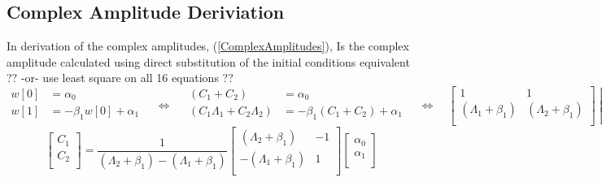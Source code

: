 \documentclass[10pt]{amsart}
\begin{document}
\subsection{Complex Amplitude Deriviation } 

In derivation of the complex amplitudes, (\ref{ComplexAmplitudes}),
Is the complex amplitude calculated using direct substitution
of the initial conditions equivalent ??
{\color{red} 
-or- use least square on all 16 equations ??
}
\[
\begin{split}
  w[ 0]&=                   \alpha_0                    \\
  w[ 1]&=-\beta_1 w[ 0]                     + \alpha_1   \\
\end{split}
\quad \Leftrightarrow \quad
\begin{split}
 \left(C_1            + C_2            \right)&=                                    \alpha_0   \\
 \left(C_1 \Lambda_1  + C_2 \Lambda_2  \right)&=-\beta_1 \left(C_1 + C_2 \right)  + \alpha_1   \\
\end{split}
\quad \Leftrightarrow \quad
\begin{bmatrix}
                  1                 &                  1                   \\
  \left(\Lambda_1 + \beta_1 \right) &  \left(\Lambda_2 + \beta_1 \right)   \\
\end{bmatrix}
\begin{bmatrix}
  C_1 \\
  C_2 \\
\end{bmatrix}
 = 
\begin{bmatrix}
  \alpha_0 \\
  \alpha_1 \\
\end{bmatrix}
\]
\[
\begin{bmatrix}
  C_1 \\
  C_2 \\
\end{bmatrix}
 = 
\frac{1}{\left(\Lambda_2 + \beta_1 \right)-\left(\Lambda_1 + \beta_1 \right) }
\begin{bmatrix}
  \left(\Lambda_2 + \beta_1 \right) &                 -1 \\
 -\left(\Lambda_1 + \beta_1 \right) &                  1  \\
\end{bmatrix}
\begin{bmatrix}
  \alpha_0 \\
  \alpha_1 \\
\end{bmatrix}
\]
\end{document}
